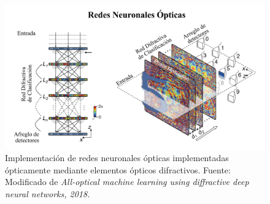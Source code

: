 \begin{figure}[!h]
    \centering
    \includegraphics[width = 1\linewidth]{images/diffractive_networks.png}
    \caption{Implementación de redes neuronales ópticas implementadas ópticamente mediante elementos ópticos difractivos. Fuente: Modificado de \textit{All-optical machine learning using diffractive deep neural networks, 2018.}}
    \label{fig:optical_networks}
\end{figure}

